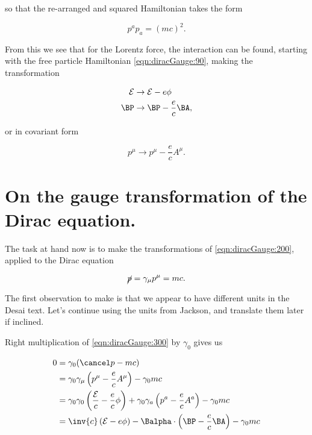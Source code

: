 so that the re-arranged and squared Hamiltonian takes the form

\begin{equation}\label{eqn:diracGauge:190}
p^a p_a = (m c)^2.
\end{equation}

From this we see that for the Lorentz force, the interaction can be found, starting with the free particle Hamiltonian \ref{eqn:diracGauge:90}, making the transformation

\begin{subequations}
\label{eqn:diracGauge:200}
\begin{align}
\mathcal{E}   &\rightarrow \mathcal{E} - e\phi \\
\BP &\rightarrow \BP - \frac{e}{c}\BA,
\end{align}
\end{subequations}

or in covariant form

\begin{equation}\label{eqn:diracGauge:210}
p^\mu \rightarrow p^\mu - \frac{e}{c}A^\mu.
\end{equation}

\section{On the gauge transformation of the Dirac equation.}

The task at hand now is to make the transformations of \ref{eqn:diracGauge:200}, applied to the Dirac equation

\begin{equation}\label{eqn:diracGauge:300}
\cancel{p} = \gamma_\mu p^\mu = m c.
\end{equation}

The first observation to make is that we appear to have different units in the Desai text.  Let's continue using the units from Jackson, and translate them later if inclined.

Right multiplication of \ref{eqn:diracGauge:300} by $\gamma_0$ gives us

\begin{align*}
0 &= \gamma_0 (\pslash - m c) \\
  &= \gamma_0 \gamma_\mu \left( p^\mu - \frac{e}{c} A^\mu \right) 
- \gamma_0 m c 
\\
  &= 
\gamma_0 \gamma_0 \left(\frac{\mathcal{E}}{c} - \frac{e}{c} \phi \right) 
+\gamma_0 \gamma_a \left(p^a - \frac{e}{c} A^a \right) 
- \gamma_0 m c \\
  &= 
\inv{c} \left( \mathcal{E}- e \phi \right) 
-\Balpha \cdot \left(\BP - \frac{e}{c} \BA \right) 
- \gamma_0 m c \\
\end{align*}


